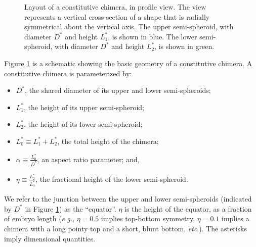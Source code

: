 \documentclass[10pt,a4paper]{article}
\def\etc{\emph{etc}.\xspace}
\begin{document}
\begin{figure}[t] 
	\begin{center}
	\end{center}
	\caption{Layout of a constitutive chimera, in profile view. The view represents a vertical cross-section of a shape that is radially symmetrical about the vertical axis. The upper semi-spheroid, with diameter $D^*$ and height $L_1^*$, is shown in blue. The lower semi-spheroid, with diameter $D^*$ and height $L^*_2$, is shown in green. } \label{fig:chimera1}
\end{figure}
\noindent
Figure \ref{fig:chimera1} is a schematic showing the basic geometry of a constitutive chimera.
A constitutive chimera is parameterized by:
\begin{itemize}
	\item $D^*$, the shared diameter of its upper and lower semi-spheroids;
	\item $L_1^*$, the height of its upper semi-spheroid;
	\item $L_2^*$, the height of its  lower semi-spheroid; 
	\item $L_0^* \equiv L_1^* + L_2^*$, the total height of the chimera;
	\item $\alpha \equiv \frac{L_0^*}{D^*}$, an aspect ratio parameter; and,
	\item $\eta \equiv \frac{L_2^*}{L_0^*}$, the fractional height of the lower semi-spheroid.
\end{itemize}
We refer to the junction between the upper and lower semi-spheroids (indicated by $D^*$ in Figure \ref{fig:chimera1}) as the ``equator''.
$\eta$ is the height of the equator, as a fraction of embryo length (\textit{e.g.}, $\eta = 0.5$ implies top-bottom symmetry, $\eta = 0.1$ implies a chimera with a long pointy top and a short, blunt bottom, \etc).
The asterisks imply dimensional quantities.
\end{document}
